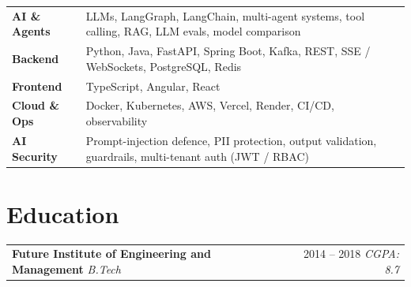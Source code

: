 \documentclass[10pt, letterpaper]{article}
\makeatletter
\newcommand{\jobheading}[4]{%
  \noindent
  \begin{tabularx}{\textwidth}{@{}X r@{}}
    \textbf{\color{primary}#1} \textbar{} \textit{\small\color{subtle}#2} &
    \small\color{subtle}#3 \textbar{} \textit{\small #4}
  \end{tabularx}%
}
\makeatother
\begin{document}
\begin{tabularx}{\textwidth}{@{} l X @{}}
\textbf{AI \& Agents} & LLMs, LangGraph, LangChain, multi-agent systems, tool calling, RAG, LLM evals, model comparison \\[1pt]
\textbf{Backend} & Python, Java, FastAPI, Spring Boot, Kafka, REST, SSE / WebSockets, PostgreSQL, Redis \\[1pt]
\textbf{Frontend} & TypeScript, Angular, React \\[1pt]
\textbf{Cloud \& Ops} & Docker, Kubernetes, AWS, Vercel, Render, CI/CD, observability \\[1pt]
\textbf{AI Security} & Prompt-injection defence, PII protection, output validation, guardrails, multi-tenant auth (JWT / RBAC) \\
\end{tabularx}

\section{Education}

\jobheading{Future Institute of Engineering and Management}{B.Tech}{2014 -- 2018}{CGPA: 8.7}
\end{document}
